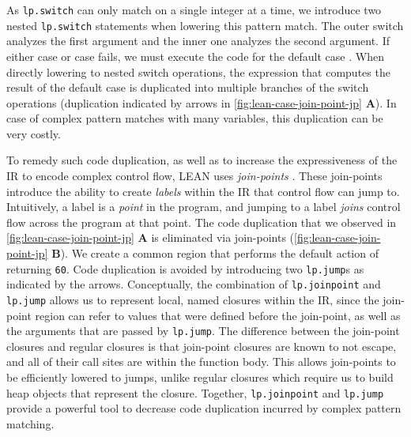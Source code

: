 \documentclass[conference]{IEEEtran}
\DeclareRobustCommand\circled[1]{\tikz[baseline=(char.base)]{
            \node[shape=circle,fill=pairedOneLightBlue,inner sep=1pt] (char) {#1};}}
\newcommand{\lpjump}{\textcolor{pairedTwoDarkBlue}{\texttt{lp.jump}}}
\newcommand{\lpjoinpoint}{\textcolor{pairedTwoDarkBlue}{\texttt{lp.joinpoint}}}
\newcommand{\lpswitch}{\textcolor{pairedTwoDarkBlue}{\texttt{lp.switch}}}
\begin{document}
As \lpswitch{} can only match on a single integer at a time,
we introduce two nested \lpswitch{} statements
when lowering this pattern match.
The outer switch analyzes the first argument and the inner one analyzes the
second argument. If either case \circled{1} or case \circled{2} fails, we must
execute the code for the default case \circled{3}. When directly lowering
to nested switch operations, the expression that computes the result of the
default case is duplicated into multiple branches of the switch operations
(duplication indicated by arrows in \autoref{fig:lean-case-join-point-jp} \textbf{A}).
In case of complex pattern matches with many
variables, this duplication can be very costly.



To remedy such code duplication, as well as to increase the expressiveness of
the IR to encode complex control flow, LEAN uses \emph{join-points}
\cite{downen2016sequent, maurer2017compiling}. These join-points introduce the
ability to create \emph{labels} within the IR that control flow can jump to.
Intuitively, a label is a \emph{point} in the program, and jumping to a label
\emph{joins} control flow across the program at that point. The code duplication
that we observed in \autoref{fig:lean-case-join-point-jp} \textbf{A}
is eliminated via join-points (\autoref{fig:lean-case-join-point-jp} \textbf{B}). We create a
common region \circled{4} that performs the default action of returning \texttt{60}. Code duplication is
avoided  by introducing
two \lpjump{}s as indicated by the arrows.
Conceptually, the combination of \lpjoinpoint{} and \lpjump{} allows us
to represent local, named closures within the IR,
since the join-point region can refer to values that were defined before the join-point,
as well as the arguments that are passed by \lpjump{}. The difference between the join-point
closures and regular closures is that join-point closures are known to not escape, and all of
their call sites are within the function body. This allows join-points to be efficiently lowered
to jumps, unlike regular closures which require us to build heap objects that represent the closure.
Together, \lpjoinpoint{} and \lpjump{} provide a powerful tool to decrease code
duplication incurred by complex pattern matching.



\end{document}
